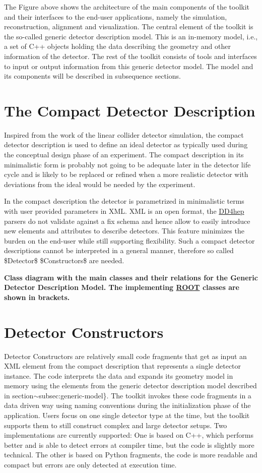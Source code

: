 The Figure above shows the architecture of the main components of the toolkit and their interfaces to the end-\/user applications, namely the simulation, reconstruction, alignment and visualization. The central element of the toolkit is the so-\/called generic detector description model. This is an in-\/memory model, i.e., a set of C++ objects holding the data describing the geometry and other information of the detector. The rest of the toolkit consists of tools and interfaces to input or output information from this generic detector model. The model and its components will be described in subsequence sections.\hypertarget{index_COMPACT}{}\section{The Compact Detector Description}\label{index_COMPACT}
Inspired from the work of the linear collider detector simulation, the compact detector description is used to define an ideal detector as typically used during the conceptual design phase of an experiment. The compact description in its minimalistic form is probably not going to be adequate later in the detector life cycle and is likely to be replaced or refined when a more realistic detector with deviations from the ideal would be needed by the experiment.

In the compact description the detector is parametrized in minimalistic terms with user provided parameters in XML. XML is an open format, the \hyperlink{namespace_d_d4hep}{DD4hep} parsers do not validate against a fix schema and hence allow to easily introduce new elements and attributes to describe detectors. This feature minimizes the burden on the end-\/user while still supporting flexibility. Such a compact detector descriptions cannot be interpreted in a general manner, therefore so called \$Detector\$ \$Constructors\$ are needed.

 {\bfseries Class diagram with the main classes and their relations for the Generic Detector Description Model. The implementing \hyperlink{namespace_r_o_o_t}{ROOT} classes are shown in brackets. }\hypertarget{index_DETECTORS}{}\section{Detector Constructors}\label{index_DETECTORS}
Detector Constructors are relatively small code fragments that get as input an XML element from the compact description that represents a single detector instance. The code interprets the data and expands its geometry model in memory using the elements from the generic detector description model described in section$\sim$subsec:generic-\/model\}. The toolkit invokes these code fragments in a data driven way using naming conventions during the initialization phase of the application. Users focus on one single detector type at the time, but the toolkit supports them to still construct complex and large detector setups. Two implementations are currently supported: One is based on C++, which performs better and is able to detect errors at compiler time, but the code is slightly more technical. The other is based on Python fragments, the code is more readable and compact but errors are only detected at execution time.

